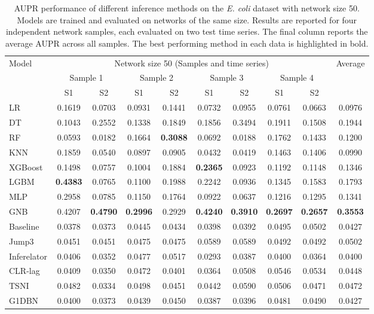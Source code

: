 \begin{table}[!t]
\centering
\caption{AUPR performance of different inference methods on the \textit{E. coli} dataset with network size 50. Models are trained and evaluated on networks of the same size. Results are reported for four independent network samples, each evaluated on two test time series. The final column reports the average AUPR across all samples. The best performing method in each data is highlighted in bold.}
\label{tab:size50}
{\renewcommand{\arraystretch}{0.8}
\setlength{\tabcolsep}{3.5pt}
\begin{tabular}{lcccccccc c}
\toprule
Model
& \multicolumn{8}{c}{Network size 50 (Samples and time series)}
& Average \\
\cmidrule(lr){2-9}
& \multicolumn{2}{c}{Sample 1}
& \multicolumn{2}{c}{Sample 2}
& \multicolumn{2}{c}{Sample 3}
& \multicolumn{2}{c}{Sample 4}
& \\
\cmidrule(lr){2-3}\cmidrule(lr){4-5}\cmidrule(lr){6-7}\cmidrule(lr){8-9}
& S1 & S2 & S1 & S2 & S1 & S2 & S1 & S2 & \\
\midrule
LR
& 0.1619 & 0.0703 & 0.0931 & 0.1441 & 0.0732 & 0.0955 & 0.0761 & 0.0663 & 0.0976 \\
DT
& 0.1043 & 0.2552 & 0.1338 & 0.1849 & 0.1856 & 0.3494 & 0.1911 & 0.1508 & 0.1944 \\
RF
& 0.0593 & 0.0182 & 0.1664 & \textbf{0.3088} & 0.0692 & 0.0188 & 0.1762 & 0.1433 & 0.1200 \\
KNN
& 0.1859 & 0.0540 & 0.0897 & 0.0905 & 0.0432 & 0.0419 & 0.1463 & 0.1406 & 0.0990 \\
XGBoost
& 0.1498 & 0.0757 & 0.1004 & 0.1884 & \textbf{0.2365} & 0.0923 & 0.1192 & 0.1148 & 0.1346 \\
LGBM
& \textbf{0.4383} & 0.0765 & 0.1100 & 0.1988 & 0.2242 & 0.0936 & 0.1345 & 0.1583 & 0.1793 \\
MLP
& 0.2958 & 0.0785 & 0.1150 & 0.1764 & 0.0922 & 0.0637 & 0.1216 & 0.1295 & 0.1341 \\
GNB
& 0.4207 & \textbf{0.4790} & \textbf{0.2996} & 0.2929 & \textbf{0.4240} & \textbf{0.3910}
& \textbf{0.2697} & \textbf{0.2657} & \textbf{0.3553} \\
\midrule
Baseline
& 0.0378 & 0.0373 & 0.0445 & 0.0434 & 0.0398 & 0.0392 & 0.0495 & 0.0502 & 0.0427 \\
Jump3
& 0.0451 & 0.0451 & 0.0475 & 0.0475 & 0.0589 & 0.0589 & 0.0492 & 0.0492 & 0.0502 \\
Inferelator
& 0.0406 & 0.0352 & 0.0477 & 0.0517 & 0.0293 & 0.0387 & 0.0400 & 0.0364 & 0.0400 \\
CLR-lag
& 0.0409 & 0.0350 & 0.0472 & 0.0401 & 0.0364 & 0.0508 & 0.0546 & 0.0534 & 0.0448 \\
TSNI
& 0.0482 & 0.0334 & 0.0498 & 0.0451 & 0.0442 & 0.0590 & 0.0506 & 0.0471 & 0.0472 \\
G1DBN
& 0.0400 & 0.0373 & 0.0439 & 0.0450 & 0.0387 & 0.0396 & 0.0481 & 0.0490 & 0.0427 \\
\bottomrule
\end{tabular}
}
\end{table}



